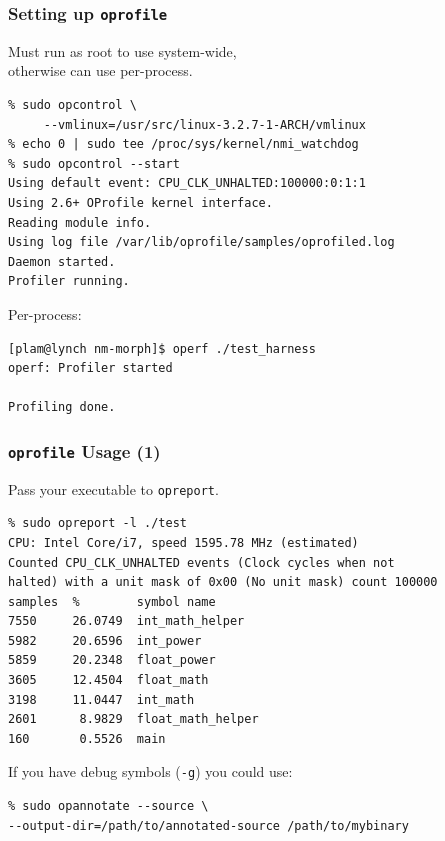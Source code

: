 \begin{frame}[fragile]
  \frametitle{Setting up {\tt oprofile}}

\large
\begin{changemargin}{1.5cm}

  Must run as root to use system-wide, \\
otherwise can use per-process.

  \begin{lstlisting}
% sudo opcontrol \
     --vmlinux=/usr/src/linux-3.2.7-1-ARCH/vmlinux
% echo 0 | sudo tee /proc/sys/kernel/nmi_watchdog
% sudo opcontrol --start
Using default event: CPU_CLK_UNHALTED:100000:0:1:1
Using 2.6+ OProfile kernel interface.
Reading module info.
Using log file /var/lib/oprofile/samples/oprofiled.log
Daemon started.
Profiler running.
  \end{lstlisting}

  Per-process:
\begin{lstlisting}
[plam@lynch nm-morph]$ operf ./test_harness
operf: Profiler started

Profiling done.
\end{lstlisting}%
\end{changemargin}

\end{frame}

\begin{frame}[fragile]
  \frametitle{{\tt oprofile} Usage (1)}
  

\large
\begin{changemargin}{1.5cm}
  Pass your executable to {\tt opreport}.

  \begin{lstlisting}
% sudo opreport -l ./test    
CPU: Intel Core/i7, speed 1595.78 MHz (estimated)
Counted CPU_CLK_UNHALTED events (Clock cycles when not
halted) with a unit mask of 0x00 (No unit mask) count 100000
samples  %        symbol name
7550     26.0749  int_math_helper
5982     20.6596  int_power
5859     20.2348  float_power
3605     12.4504  float_math
3198     11.0447  int_math
2601      8.9829  float_math_helper
160       0.5526  main
  \end{lstlisting}
  
    If you have debug symbols ({\tt -g}) you could use:

  \begin{lstlisting}
% sudo opannotate --source \
--output-dir=/path/to/annotated-source /path/to/mybinary
  \end{lstlisting}
  \end{changemargin}
\end{frame}

